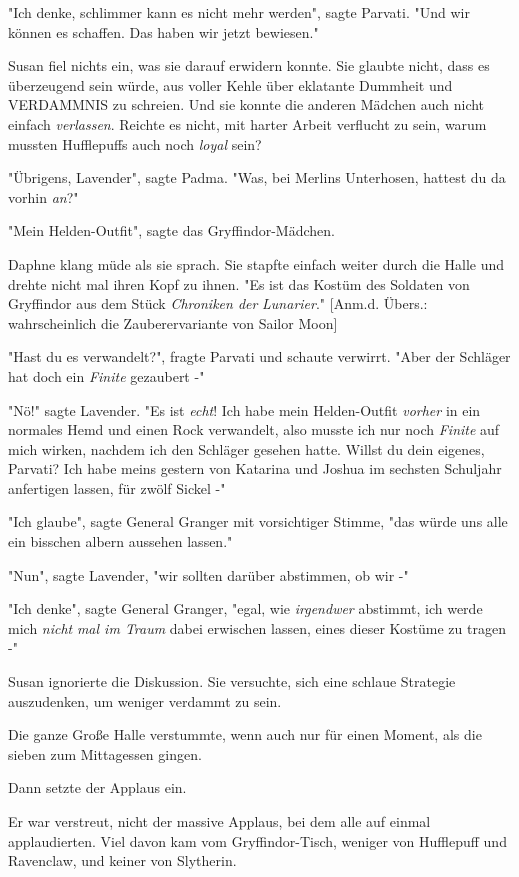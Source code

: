 {"Ich denke, schlimmer kann es nicht mehr werden", sagte Parvati. "Und wir können es schaffen. Das haben wir jetzt bewiesen."

Susan fiel nichts ein, was sie darauf erwidern konnte. Sie glaubte nicht, dass es überzeugend sein würde, aus voller Kehle über eklatante Dummheit und VERDAMMNIS zu schreien. Und sie konnte die anderen Mädchen auch nicht einfach \emph{verlassen}. Reichte es nicht, mit harter Arbeit verflucht zu sein, warum mussten Hufflepuffs auch noch \emph{loyal} sein?

"Übrigens, Lavender", sagte Padma. "Was, bei Merlins Unterhosen, hattest du da vorhin \emph{an}?"

"Mein Helden-Outfit", sagte das Gryffindor-Mädchen.

Daphne klang müde als sie sprach. Sie stapfte einfach weiter durch die Halle und drehte nicht mal ihren Kopf zu ihnen. "Es ist das Kostüm des Soldaten von Gryffindor aus dem Stück \emph{Chroniken der} \emph{Lunarier}." {[}Anm.d. Übers.: wahrscheinlich die Zauberervariante von Sailor Moon{]}

"Hast du es verwandelt?", fragte Parvati und schaute verwirrt. "Aber der Schläger hat doch ein \emph{Finite} gezaubert -"

"Nö!" sagte Lavender. "Es ist \emph{echt}! Ich habe mein Helden-Outfit \emph{vorher} in ein normales Hemd und einen Rock verwandelt, also musste ich nur noch \emph{Finite} auf mich wirken, nachdem ich den Schläger gesehen hatte. Willst du dein eigenes, Parvati? Ich habe meins gestern von Katarina und Joshua im sechsten Schuljahr anfertigen lassen, für zwölf Sickel -"

"Ich glaube", sagte General Granger mit vorsichtiger Stimme, "das würde uns alle ein bisschen albern aussehen lassen."

"Nun", sagte Lavender, "wir sollten darüber abstimmen, ob wir -"

"Ich denke", sagte General Granger, "egal, wie \emph{irgendwer} abstimmt, ich werde mich \emph{nicht} \emph{mal im Traum} dabei erwischen lassen, eines dieser Kostüme zu tragen -"

Susan ignorierte die Diskussion. Sie versuchte, sich eine schlaue Strategie auszudenken, um weniger verdammt zu sein.

Die ganze Große Halle verstummte, wenn auch nur für einen Moment, als die sieben zum Mittagessen gingen.

Dann setzte der Applaus ein.

Er war verstreut, nicht der massive Applaus, bei dem alle auf einmal applaudierten. Viel davon kam vom Gryffindor-Tisch, weniger von Hufflepuff und Ravenclaw, und keiner von Slytherin.

}

